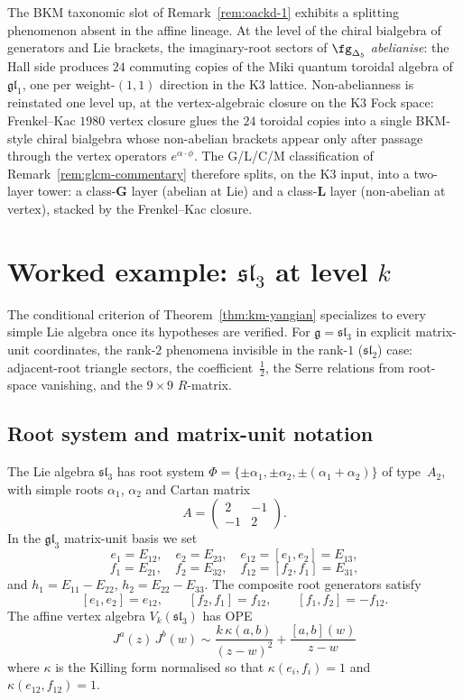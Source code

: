 \begin{remark}
\label{rem:oackd-2}
%
%
%
The BKM taxonomic slot of Remark~\ref{rem:oackd-1} exhibits a
splitting phenomenon absent in the affine lineage. At the level of the
chiral bialgebra of generators and Lie brackets, the imaginary-root
sectors of $\fg_{\Delta_5}$ \emph{abelianise}: the Hall side produces
$24$ commuting copies of the Miki quantum toroidal algebra of
$\mathfrak{gl}_1$, one per weight-$(1,1)$ direction in the K3 lattice.
Non-abelianness is reinstated one level up, at the vertex-algebraic
closure on the K3 Fock space: Frenkel--Kac $1980$ vertex closure
glues the $24$ toroidal copies into a single BKM-style chiral bialgebra
whose non-abelian brackets appear only after passage through the
vertex operators $e^{\alpha\cdot\phi}$. The G/L/C/M classification of
Remark~\ref{rem:glcm-commentary} therefore splits, on the K3 input, into
a two-layer tower: a class-$\mathbf{G}$ layer (abelian at Lie) and a
class-$\mathbf{L}$ layer (non-abelian at vertex), stacked by the
Frenkel--Kac closure.
\end{remark}



\section{Worked example: \texorpdfstring{$\mathfrak{sl}_3$}{affine sl(3)} at level \texorpdfstring{$k$}{k}}
\label{sec:sl3-ordered-bar}

The conditional criterion of Theorem~\ref{thm:km-yangian}
specializes to every simple Lie algebra once its hypotheses are
verified.
For $\mathfrak{g}=\mathfrak{sl}_3$ in
explicit matrix-unit coordinates, the rank-$2$ phenomena
invisible in the rank-$1$ ($\mathfrak{sl}_2$) case:
adjacent-root triangle sectors, the coefficient~$\frac12$,
the Serre relations from root-space vanishing, and the $9\times 9$
$R$-matrix.

\subsection{Root system and matrix-unit notation}

The Lie algebra $\mathfrak{sl}_3$ has root system
$\Phi=\{\pm\alpha_1,\pm\alpha_2,\pm(\alpha_1+\alpha_2)\}$
of type~$A_2$, with simple roots $\alpha_1$, $\alpha_2$ and
Cartan matrix
\[
A=\begin{pmatrix}2&-1\\-1&2\end{pmatrix}.
\]
In the $\mathfrak{gl}_3$ matrix-unit basis we set
\[
e_1=E_{12},\quad
e_2=E_{23},\quad
e_{12}=[e_1,e_2]=E_{13},
\]
\[
f_1=E_{21},\quad
f_2=E_{32},\quad
f_{12}=[f_2,f_1]=E_{31},
\]
and $h_1=E_{11}-E_{22}$, $h_2=E_{22}-E_{33}$. The composite root
generators satisfy
\[
[e_1,e_2]=e_{12},
\qquad
[f_2,f_1]=f_{12},
\qquad
[f_1,f_2]=-f_{12}.
\]
The affine vertex algebra $V_k(\mathfrak{sl}_3)$ has OPE
\[
J^a(z)\,J^b(w)\sim\frac{k\,\kappa(a,b)}{(z-w)^2}+\frac{[a,b](w)}{z-w}
\]
where $\kappa$ is the Killing form normalised so that
$\kappa(e_i,f_i)=1$ and $\kappa(e_{12},f_{12})=1$.

